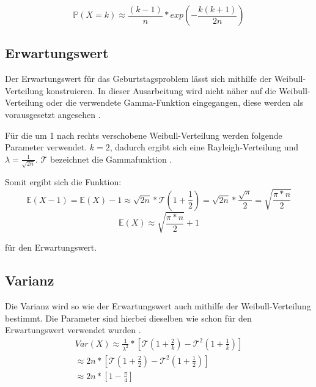 \documentclass[../main.tex]{subfiles}
\begin{document}
\begin{flushleft}
\begin{equation}
\mathbb{P}(X = k) \approx \frac{ (k-1) }{ n } * exp( - \frac{ k (k + 1) }{ 2n } )
\end{equation}

 \subsection{Erwartungswert}

Der Erwartungswert für das Geburtstagsproblem lässt sich mithilfe der Weibull-Verteilung konstruieren. In dieser Ausarbeitung wird nicht näher auf die Weibull-Verteilung oder die verwendete Gamma-Funktion eingegangen, diese werden als vorausgesetzt angesehen \cite{rinne}.  \newline

Für die um 1 nach rechts verschobene Weibull-Verteilung werden folgende Parameter verwendet. $k = 2$, dadurch ergibt sich eine Rayleigh-Verteilung und $\lambda = \frac{ 1 }{ \sqrt{2n} }$.
$\mathcal{T}$ bezeichnet die Gammafunktion \cite{rinne}. \newline

Somit ergibt sich die Funktion:
\begin{equation}
\mathbb{E}(X - 1) = \mathbb{E}(X) - 1 \approx \sqrt{ 2n } * \mathcal{T} (1 + \frac{ 1 }{ 2 } ) = \sqrt{ 2n } * \frac{ \sqrt{ \pi } }{ 2 } = \sqrt{ \frac{ \pi*n }{ 2 } }
\end{equation}
\begin{equation}
\mathbb{E}(X) \approx \sqrt{ \frac{ \pi*n }{ 2 } } + 1
\end{equation}

für den Erwartungswert.

 \subsection{Varianz}

Die Varianz wird so wie der Erwartungswert auch mithilfe der Weibull-Verteilung bestimmt. Die Parameter sind hierbei dieselben wie schon für den Erwartungswert verwendet wurden  \cite{rinne}.
\begin{eqnarray}
Var(X) \approx \frac{ 1 }{ \lambda^{ 2 } } * [\mathcal{T}(1+\frac{ 2 }{ k }) - \mathcal{T}^{ 2 }(1+\frac{ 1 }{ k } )]   \label{eq:08}\\
\approx 2n * [\mathcal{T}(1+\frac{ 2 }{ 2 }) - \mathcal{T}^{ 2 }(1+\frac{ 1 }{ 2 } )] \\
\approx 2n * [1 - \frac{ \pi }{ 4 }]
\end{eqnarray}


\end{flushleft}
\end{document}
